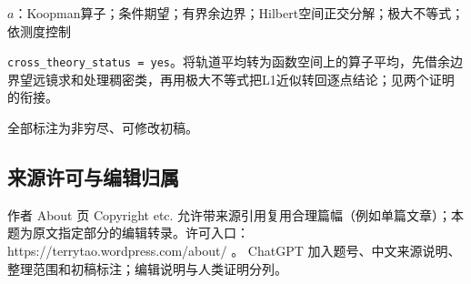 \documentclass[UTF8,11pt]{ctexart}
\theoremstyle{definition}
\begin{document}
$a$：Koopman算子；条件期望；有界余边界；Hilbert空间正交分解；极大不等式；依测度控制

\texttt{cross\_theory\_status = yes}。将轨道平均转为函数空间上的算子平均，先借余边界望远镜求和处理稠密类，再用极大不等式把L1近似转回逐点结论；见两个证明的衔接。

全部标注为非穷尽、可修改初稿。
\subsection*{来源许可与编辑归属}
作者 About 页 Copyright etc. 允许带来源引用复用合理篇幅（例如单篇文章）；本题为原文指定部分的编辑转录。许可入口：https://terrytao.wordpress.com/about/ 。
ChatGPT 加入题号、中文来源说明、整理范围和初稿标注；编辑说明与人类证明分列。
\end{document}
